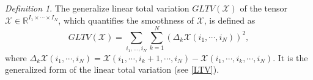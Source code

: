 \documentclass[12pt, draftcls, onecolumn]{IEEEtran}
\theoremstyle{plain}
\theoremstyle{definition}
\theoremstyle{remark}
\newtheorem{definition}{Definition}
\begin{document}
\begin{definition}
	\label{def_smooth_func}
	The generalize linear total variation $GLTV(\mathcal X)$ of the tensor $\mathcal{X}\in\mathbb{R}^{I_1\times \cdots \times I_N}$, which quantifies the smoothness of $\mathcal{X}$, is defined as 
	$$GLTV(\mathcal{X})=\sum_{i_1,\dots,i_N}\sum_{k=1}^{N}(\Delta_k\mathcal{X}(i_1,\cdots,i_N))^2,$$
	where $\Delta_k\mathcal{X}(i_1,\cdots,i_N)=\mathcal{X}(i_1,\cdots,i_k + 1,\cdots,i_N)-\mathcal{X}(i_1,\cdots,i_k,\cdots,i_N).$
	It is the generalized form of the linear total variation (see \eqref{LTV}).
\end{definition}
\end{document}
